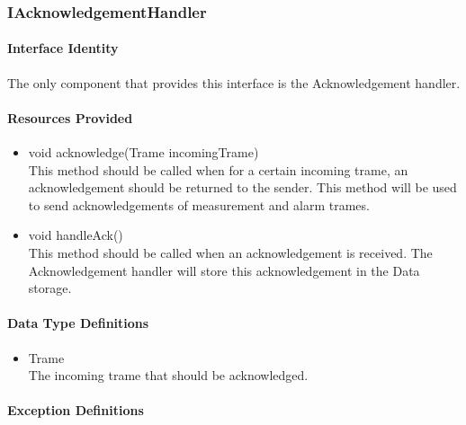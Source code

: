 \subsubsection{IAcknowledgementHandler}
\paragraph{Interface Identity}
The only component that provides this interface is the Acknowledgement handler.
\paragraph{Resources Provided}
\begin{itemize}
	\item{void acknowledge(Trame incomingTrame)}\\
	This method should be called when for a certain incoming trame, an acknowledgement should be
		returned to the sender. This method will be used to send acknowledgements of measurement
		and alarm trames.
	\item{void handleAck()}\\
	This method should be called when an acknowledgement is received. The Acknowledgement handler
		will store this acknowledgement in the Data storage.
\end{itemize}
\paragraph{Data Type Definitions}
\begin{itemize}
	\item Trame\\
	The incoming trame that should be acknowledged.
\end{itemize}
\paragraph{Exception Definitions}
